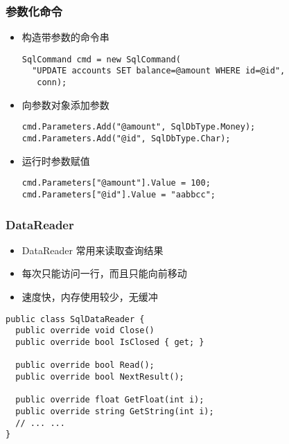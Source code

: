 
\begin{frame}[fragile]
\frametitle{参数化命令}
\begin{itemize}
\item 构造带参数的命令串
\begin{lstlisting}
SqlCommand cmd = new SqlCommand(
  "UPDATE accounts SET balance=@amount WHERE id=@id",
   conn);
\end{lstlisting}
\item 向参数对象添加参数
\begin{lstlisting}
cmd.Parameters.Add("@amount", SqlDbType.Money);
cmd.Parameters.Add("@id", SqlDbType.Char);
\end{lstlisting}
\item 运行时参数赋值
\begin{lstlisting}
cmd.Parameters["@amount"].Value = 100;
cmd.Parameters["@id"].Value = "aabbcc";
\end{lstlisting}
\end{itemize}
\end{frame}

\begin{frame}[fragile]
\frametitle{DataReader}
\begin{itemize}
\item DataReader 常用来读取查询结果
\item 每次只能访问一行，而且只能向前移动
\item 速度快，内存使用较少，无缓冲
\end{itemize}
\begin{lstlisting}
public class SqlDataReader {
  public override void Close()
  public override bool IsClosed { get; }

  public override bool Read();
  public override bool NextResult();

  public override float GetFloat(int i);
  public override string GetString(int i);
  // ... ...
}
\end{lstlisting}
\end{frame}

